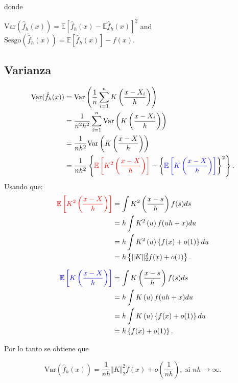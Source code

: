 \documentclass[
  12pt,
]{book}
\theoremstyle{definition}
\theoremstyle{definition}
\theoremstyle{definition}
\theoremstyle{remark}
\begin{document}
donde

\(\mathrm{Var}\left(\hat{f}_{h}(x)\right)=\mathbb{E}\left[\hat{f}_{h}(x)-\mathbb{E}\hat{f}_{h}(x)\right]^{2}\) and \(\mathrm{Sesgo}\left(\hat{f}_{h}(x)\right)=\mathbb{E}\left[\hat{f}_{h}(x)\right]-f(x)\).

\hypertarget{varianza-1}{%
\subsection{Varianza}\label{varianza-1}}

\begin{align*}
\mathrm{Var}(\hat{f}_{h}(x))
& =\mathrm{Var}\left(\frac{1}{n}\sum_{i=1}^{n}K\left(\frac{x-X_{i}}{h}\right)\right)          \\
& =\frac{1}{n^{2}h^{2}}\sum_{i=1}^{n}\mathrm{Var}\left(K\left(\frac{x-X_{i}}{h}\right)\right) \\
& =\frac{1}{nh^{2}}\mathrm{Var}\left(K\left(\frac{x-X}{h}\right)\right)                       \\
& =\frac{1}{nh^{2}}\left\{
\textcolor{red}{\mathbb{E}\left[K^{2}\left(\frac{x-X}{h}\right)\right]}
-\left\{
\textcolor{blue}{\mathbb{E}\left[K\left(\frac{x-X}{h}\right)\right]}
\right\}^{2}
\right\}.
\end{align*}
Usando que:
\begin{align*}
\textcolor{red}{\mathbb{E}\left[K^{2}\left(\frac{x-X}{h}\right)\right]}
& =\int K^{2}\left(\frac{x-s}{h}\right)f(s)ds            \\
& =h\int K^{2}\left(u\right)f(uh+x)du                    \\
& =h\int K^{2}\left(u\right)\left\{ f(x)+o(1)\right\} du \\
& =h\left\{ \Vert K\Vert_{2}^{2}f(x)+o(1)\right\} .
\end{align*}

\begin{align*}
\textcolor{blue}{\mathbb{E}\left[K\left(\frac{x-X}{h}\right)\right]}
& =\int K\left(\frac{x-s}{h}\right)f(s)ds            \\
& = h\int K\left(u\right)f(uh+x)du                    \\
& =h\int K\left(u\right)\left\{ f(x)+o(1)\right\} du \\
& =h\left\{f(x)+o(1)\right\} .
\end{align*}

Por lo tanto se obtiene que

\begin{equation*}
\mathrm{Var}\left(\hat{f}_{h}(x)\right) = \frac{1}{nh} \Vert K\Vert_{2}^{2}f(x) + o\left(\frac{1}{nh}\right), \text{ si } nh\to \infty.
\end{equation*}
\end{document}
